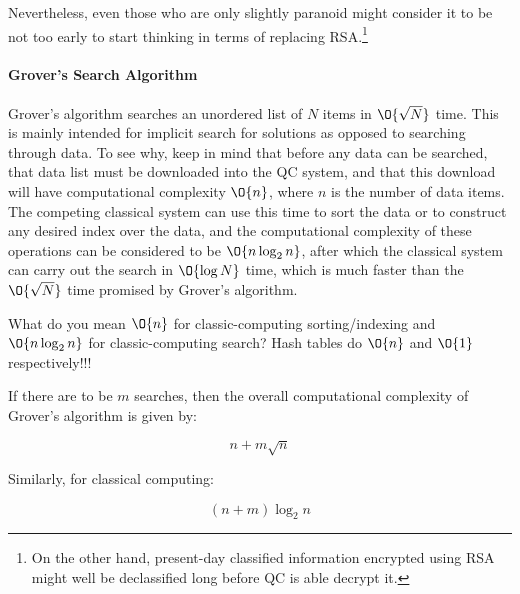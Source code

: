 Nevertheless, even those who are only slightly paranoid might consider
it to be not too early to start thinking in terms of replacing RSA.\footnote{
	On the other hand, present-day classified information encrypted
	using RSA might well be declassified long before QC is able
	decrypt it.}

\paragraph{Grover's Search Algorithm}
\label{sec:future:Grover's Search Algorithm}

Grover's algorithm searches an unordered list of $N$ items
in $\O{\sqrt N}$ time.
This is mainly intended for implicit search for solutions as opposed
to searching through data.
To see why, keep in mind that before any data can be searched,
that data list must be downloaded into the QC system, and that
this download will have computational complexity $\O{n}$, where
$n$ is the number of data items.
The competing classical system can use this time to sort the data
or to construct any desired index over the data, and the computational
complexity of these operations can be considered to be $\O{n \log_2 n}$,
after which the classical
system can carry out the search in $\O{\log N}$ time, which
is much faster than the $\O{\sqrt N}$ time promised by
Grover's algorithm.

\QuickQuiz{}
	What do you mean $\O{n}$ for classic-computing sorting/indexing
	and $\O{n \log_2 n}$ for classic-computing search?
	Hash tables do $\O{n}$ and $\O{1}$ respectively!!!
 \QuickQuizEnd

If there are to be $m$ searches, then the overall computational
complexity of Grover's algorithm is given by:

\begin{equation}
	n + m \sqrt n
\end{equation}

Similarly, for classical computing:

\begin{equation}
	\left( n + m \right) \log_2 n
\end{equation}

